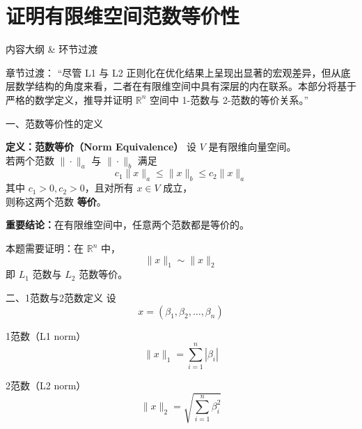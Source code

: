 \documentclass[aspectratio=169]{beamer}
\begin{document}
\section{证明有限维空间范数等价性}

\begin{frame}{内容大纲 \& 环节过渡}
    \tableofcontents[currentsection]
    \vspace{0.5cm}
    \begin{block}{章节过渡：}
        “尽管 L1 与 L2 正则化在优化结果上呈现出显著的宏观差异，但从底层数学结构的角度来看，二者在有限维空间中具有深层的内在联系。本部分将基于严格的数学定义，推导并证明 $\mathbb{R}^n$ 空间中 1-范数与 2-范数的等价关系。”
    \end{block}
\end{frame}

\begin{frame}{一、范数等价性的定义}
    \begin{block}{\textbf{定义：范数等价（Norm Equivalence）}}
        设 $V$ 是有限维向量空间。\\
        若两个范数 $\|\cdot\|_a$ 与 $\|\cdot\|_b$ 满足
        $$ c_1\|x\|_a \le \|x\|_b \le c_2\|x\|_a $$
        其中 $c_1>0, c_2>0$，且对所有 $x\in V$ 成立，\\
        则称这两个范数 \textbf{等价}。
    \end{block}
    
    \textbf{重要结论：}在有限维空间中，任意两个范数都是等价的。
    
    \vspace{0.3cm}
    本题需要证明：在 $\mathbb{R}^n$ 中，
    $$ \|x\|_1 \sim \|x\|_2 $$
    即 $L_1$ 范数与 $L_2$ 范数等价。
\end{frame}

\begin{frame}{二、1范数与2范数定义}
    设
    $$ x=(\beta_1,\beta_2,\dots,\beta_n) $$
    
    \begin{block}{1范数（L1 norm）}
        $$ \|x\|_1=\sum_{i=1}^{n}|\beta_i| $$
    \end{block}

    \begin{block}{2范数（L2 norm）}
        $$ \|x\|_2=\sqrt{\sum_{i=1}^{n}\beta_i^2} $$
    \end{block}
\end{frame}
\end{document}
